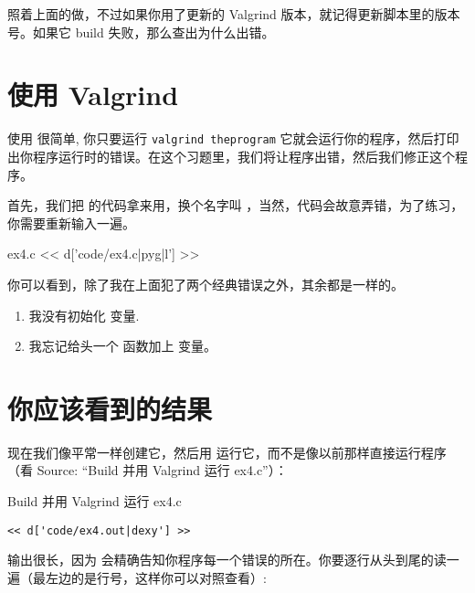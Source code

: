 照着上面的做，不过如果你用了更新的 Valgrind 版本，就记得更新脚本里的版本号。如果它 build 失败，那么查出为什么出错。

\section{使用 Valgrind}

使用  很简单, 你只要运行 \verb|valgrind theprogram| 它就会运行你的程序，然后打印出你程序运行时的错误。在这个习题里，我们将让程序出错，然后我们修正这个程序。

 首先，我们把  的代码拿来用，换个名字叫  ，当然，代码会故意弄错，为了练习，你需要重新输入一遍。

\begin{code}{ex4.c}
<< d['code/ex4.c|pyg|l'] >>
\end{code}

你可以看到，除了我在上面犯了两个经典错误之外，其余都是一样的。

\begin{enumerate}
\item 我没有初始化  变量.
\item 我忘记给头一个  函数加上  变量。
\end{enumerate}

\section{你应该看到的结果}

现在我们像平常一样创建它，然后用  运行它，而不是像以前那样直接运行程序（看 Source: “Build 并用 Valgrind 运行 ex4.c”）：

\begin{Terminal}{Build 并用 Valgrind 运行 ex4.c}
\begin{lstlisting}
<< d['code/ex4.out|dexy'] >>
\end{lstlisting}
\end{Terminal}

输出很长，因为  会精确告知你程序每一个错误的所在。你要逐行从头到尾的读一遍（最左边的是行号，这样你可以对照查看）:

